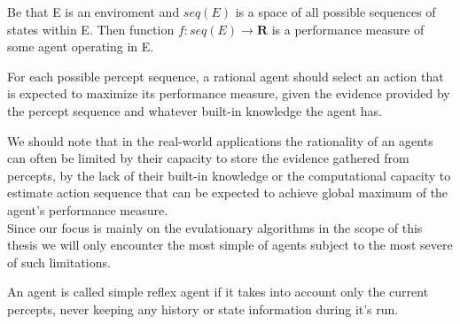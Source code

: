 \begin{defn}\citep{russell2021}
Be that E is an enviroment and  $ seq(E) $ is a space of all possible sequences of states within E.
Then function $ f: seq(E)\rightarrow \textbf{R} $ is a performance measure of some agent operating in E.
\end{defn}
\begin{defn}\citep{russell2021}
For each possible percept sequence, a rational agent should select an action that is expected to maximize its performance measure, given the evidence provided by the percept sequence and whatever built-in knowledge the agent has.
\end{defn}
We should note that in the real-world applications the rationality of an agents can often be limited by their capacity to store the evidence gathered from percepts, by the lack of their built-in knowledge or the computational capacity to estimate action sequence that can be expected to achieve global maximum of the agent's performance measure. \\
Since our focus is mainly on the evulationary algorithms in the scope of this thesis we will only encounter the most simple of agents subject to the most severe of such limitations.
\begin{defn}\citep{russell2021}
An agent is called simple reflex agent if it takes into account only the current percepts, never keeping any history or state information during it's run.
\end{defn}


